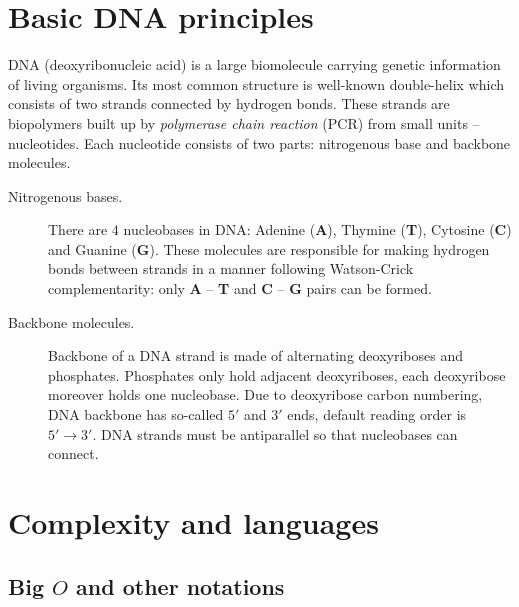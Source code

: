 \section{Basic DNA principles}
\label{sec:DNA}
	
	DNA (deoxyribonucleic acid) is a large biomolecule carrying genetic information of living organisms. Its most common structure is well-known double-helix which consists of two strands connected by hydrogen bonds. These strands are biopolymers built up by {\em polymerase chain reaction} (PCR) from small units -- nucleotides. Each nucleotide consists of two parts: nitrogenous base and backbone molecules.
	\begin{description}
		\item[Nitrogenous bases.] There are $4$ nucleobases in DNA: Adenine ({\bf A}), Thymine ({\bf T}), Cytosine ({\bf C}) and Guanine ({\bf G}). These molecules are responsible for making hydrogen bonds between strands in a manner following Watson-Crick complementarity: only {\bf A} -- {\bf T} and {\bf C} -- {\bf G} pairs can be formed.
		\item[Backbone molecules.] Backbone of a DNA strand is made of alternating deoxyriboses and phosphates. Phosphates only hold adjacent deoxyriboses, each deoxyribose moreover holds one nucleobase. Due to deoxyribose carbon numbering, DNA backbone has so-called $5'$ and $3'$ ends, default reading order is $5'\rightarrow 3'$. DNA strands must be antiparallel so that nucleobases can connect.
	\end{description}

\section{Complexity and languages}
\label{sec:minf}
	
	\subsection{Big $O$ and other notations}
		
